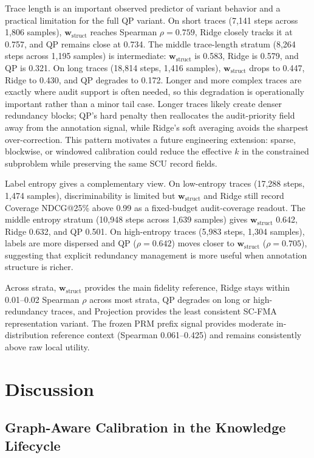 \documentclass[a4paper,fleqn]{cas-sc}
\newcommand{\wstruct}{\ensuremath{\mathbf{w}_{\mathrm{struct}}}}
\begin{document}
Trace length is an important observed predictor of variant behavior and a practical limitation for the full QP variant. On short traces (7,141 steps across 1,806 samples), \wstruct{} reaches Spearman $\rho = 0.759$, Ridge closely tracks it at 0.757, and QP remains close at 0.734. The middle trace-length stratum (8,264 steps across 1,195 samples) is intermediate: \wstruct{} is 0.583, Ridge is 0.579, and QP is 0.321. On long traces (18,814 steps, 1,416 samples), \wstruct{} drops to 0.447, Ridge to 0.430, and QP degrades to 0.172. Longer and more complex traces are exactly where audit support is often needed, so this degradation is operationally important rather than a minor tail case. Longer traces likely create denser redundancy blocks; QP's hard penalty then reallocates the audit-priority field away from the annotation signal, while Ridge's soft averaging avoids the sharpest over-correction. This pattern motivates a future engineering extension: sparse, blockwise, or windowed calibration could reduce the effective $k$ in the constrained subproblem while preserving the same SCU record fields.

Label entropy gives a complementary view. On low-entropy traces (17,288 steps, 1,474 samples), discriminability is limited but \wstruct{} and Ridge still record Coverage NDCG@25\% above 0.99 as a fixed-budget audit-coverage readout. The middle entropy stratum (10,948 steps across 1,639 samples) gives \wstruct{} 0.642, Ridge 0.632, and QP 0.501. On high-entropy traces (5,983 steps, 1,304 samples), labels are more dispersed and QP ($\rho = 0.642$) moves closer to \wstruct{} ($\rho = 0.705$), suggesting that explicit redundancy management is more useful when annotation structure is richer.

Across strata, \wstruct{} provides the main fidelity reference, Ridge stays within 0.01--0.02 Spearman $\rho$ across most strata, QP degrades on long or high-redundancy traces, and Projection provides the least consistent SC-FMA representation variant. The frozen PRM prefix signal provides moderate in-distribution reference context (Spearman 0.061--0.425) and remains consistently above raw local utility.

\section{Discussion}
\label{sec:discussion}

\subsection{Graph-Aware Calibration in the Knowledge Lifecycle}
\label{sec:knowledge-lifecycle}
\end{document}
